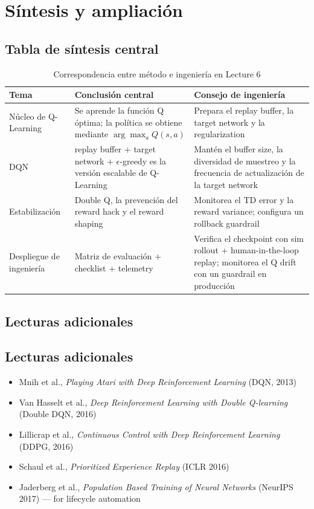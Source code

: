 \section{Síntesis y ampliación}

\subsection{Tabla de síntesis central}

\begin{table}[H]
\centering
\begin{tabular}{p{} p{} p{}}
\toprule
Tema & Conclusión central & Consejo de ingeniería \\
\midrule
Núcleo de Q-Learning & Se aprende la función Q óptima; la política se obtiene mediante $\arg\max_a Q(s,a)$ & Prepara el replay buffer, la target network y la regularization \\
DQN & replay buffer + target network + $\epsilon$-greedy es la versión escalable de Q-Learning & Mantén el buffer size, la diversidad de muestreo y la frecuencia de actualización de la target network \\
Estabilización & Double Q, la prevención del reward hack y el reward shaping & Monitorea el TD error y la reward variance; configura un rollback guardrail \\
Despliegue de ingeniería & Matriz de evaluación + checklist + telemetry & Verifica el checkpoint con sim rollout + human-in-the-loop replay; monitorea el Q drift con un guardrail en producción \\
\bottomrule
\end{tabular}
\caption{Correspondencia entre método e ingeniería en Lecture 6}
\end{table}

\subsection{Lecturas adicionales}
\subsection{Lecturas adicionales}

\begin{itemize}
    \item Mnih et al., \textit{Playing Atari with Deep Reinforcement Learning} (DQN, 2013)
    \item Van Hasselt et al., \textit{Deep Reinforcement Learning with Double Q-learning} (Double DQN, 2016)
    \item Lillicrap et al., \textit{Continuous Control with Deep Reinforcement Learning} (DDPG, 2016)
    \item Schaul et al., \textit{Prioritized Experience Replay} (ICLR 2016)
    \item Jaderberg et al., \textit{Population Based Training of Neural Networks} (NeurIPS 2017) — for lifecycle automation
\end{itemize}

